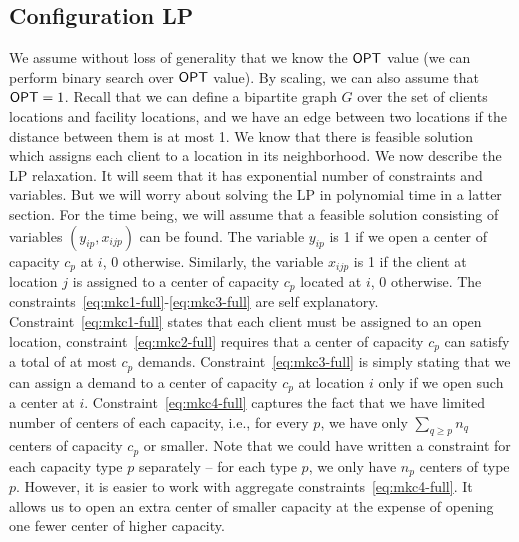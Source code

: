 \subsection{Configuration LP}
\label{sec:lp}
We assume without loss of generality that we know the $\mathsf{OPT}$ value (we can perform binary search over $\mathsf{OPT}$ value). By scaling, we can also assume that
 $\mathsf{OPT} = 1$. Recall that we can define a bipartite graph $G$ over the set of clients locations and facility locations, and we have an edge between
 two locations if the distance between them is at most 1. We know that there is feasible solution which assigns each client to a location in its neighborhood.
 We now describe the LP relaxation. It will seem that it has exponential number of constraints and variables. But we will worry about solving the LP in polynomial time in a latter section. For the time being, we will assume that a feasible solution consisting of variables
 $(y_{ip}, x_{ijp})$  can be found.
  The variable $y_{ip}$ is 1 if we open a
center of capacity $c_p$ at $i$, 0 otherwise. Similarly, the variable $x_{ijp}$ is 1 if the client at location $j$ is assigned to a center of capacity $c_p$ located at $i$, 0 otherwise. The constraints~\eqref{eq:mkc1-full}-\eqref{eq:mkc3-full} are self explanatory. Constraint~\eqref{eq:mkc1-full} states that each client must be assigned to an open location, constraint~\eqref{eq:mkc2-full} requires that a center of capacity $c_p$ can satisfy a total of at most
$c_p$ demands. Constraint~\eqref{eq:mkc3-full} is simply stating that we can assign a demand to a center of capacity $c_p$ at location $i$ only if we open such a center at $i$. Constraint~\eqref{eq:mkc4-full} captures the fact that we have limited number of centers of each capacity, i.e., for
every $p$, we have only $\sum_{q \geq p} n_q$ centers of capacity $c_p$ or smaller. Note that we could have written a constraint for each capacity type $p$ separately -- for each type $p$, we only have $n_p$ centers of type $p$. However, it is easier to work with aggregate constraints~\eqref{eq:mkc4-full}. It allows us to open an extra center of smaller capacity at the expense of opening one fewer center of higher capacity.

